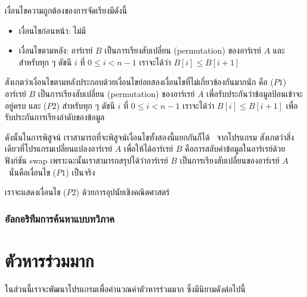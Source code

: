 เงื่อนไข{\wbr}ความ{\wbr}ถูกต้อง{\wbr}ของ{\wbr}การ{\wbr}จัดเรียง{\wbr}มี{\wbr}ดังนี้{\wbr}
\begin{itemize}
\item เงื่อนไข{\wbr}ก่อนหน้า: ไม่{\wbr}มี{\wbr}
\item เงื่อนไข{\wbr}ตาม{\wbr}หลัง: อาร์เรย์ $B$ เป็น{\wbr}การ{\wbr}เรียง{\wbr}สับเปลี่ยน (permutation) ของ{\wbr}อาร์เรย์ $A$ และ{\wbr}สำหรับ{\wbr}ทุก ๆ ดัชนี $i$ ที่ $0\leq i<n-1$ เรา{\wbr}จะ{\wbr}ได้{\wbr}ว่า $B[i]\leq B[i+1]$
\end{itemize}

สังเกต{\wbr}ว่า{\wbr}เงื่อนไข{\wbr}ตาม{\wbr}หลัง{\wbr}ประกอบ{\wbr}ด้วย{\wbr}เงื่อนไข{\wbr}ย่อย{\wbr}สอง{\wbr}เงื่อนไข{\wbr}ที่{\wbr}ไม่{\wbr}เกี่ยวข้อง{\wbr}กัน{\wbr}มาก{\wbr}นัก คือ{\wbr}
($P1$) อาร์เรย์ $B$ เป็น{\wbr}การ{\wbr}เรียง{\wbr}สับเปลี่ยน (permutation) ของ{\wbr}อาร์เรย์ $A$
เพื่อ{\wbr}รับประกัน{\wbr}ว่า{\wbr}ข้อมูล{\wbr}ป้อน{\wbr}เข้า{\wbr}จะ{\wbr}อยู่{\wbr}ครบ และ ($P2$) สำหรับ{\wbr}ทุก ๆ ดัชนี $i$ ที่ $0\leq
i<n-1$ เรา{\wbr}จะ{\wbr}ได้{\wbr}ว่า $B[i]\leq B[i+1]$ เพื่อ{\wbr}รับประกัน{\wbr}การ{\wbr}เรียงลำดับ{\wbr}ของ{\wbr}ข้อมูล{\wbr}

ดังนั้น{\wbr}ใน{\wbr}การ{\wbr}พิสูจน์ เรา{\wbr}สามารถ{\wbr}ที่{\wbr}จะ{\wbr}พิสูจน์{\wbr}เงื่อนไข{\wbr}ทั้ง{\wbr}สอง{\wbr}นี้{\wbr}แยกกัน{\wbr}ก็ได้ \ จาก{\wbr}โปรแกรม{\wbr}
สังเกต{\wbr}ว่า{\wbr}สิ่ง{\wbr}เดียว{\wbr}ที่{\wbr}โปรแกรม{\wbr}เปลี่ยนแปลง{\wbr}อาร์เรย์ $A$ เพื่อให้{\wbr}ได้{\wbr}อาร์เรย์ $B$
คือ{\wbr}การ{\wbr}สลับ{\wbr}ค่า{\wbr}ข้อมูล{\wbr}ใน{\wbr}อาร์เรย์{\wbr}ด้วย{\wbr}ฟังก์ชัน {\ct swap}
เพราะฉะนั้น{\wbr}เรา{\wbr}สามารถ{\wbr}สรุป{\wbr}ได้{\wbr}ว่า{\wbr}อาร์เรย์ $B$ เป็น{\wbr}การ{\wbr}เรียง{\wbr}สับเปลี่ยน{\wbr}ของ{\wbr}อาร์เรย์ $A$
\ นั่น{\wbr}คือ{\wbr}เงื่อนไข ($P1$) เป็นจริง{\wbr}

เรา{\wbr}จะ{\wbr}แสดง{\wbr}เงื่อนไข ($P2$) ด้วย{\wbr}การ{\wbr}อุปนัย{\wbr}เชิง{\wbr}คณิตศาสตร์{\wbr}

\subsubsection{อัล{\wbr}กอ{\wbr}ริ{\wbr}ทึม{\wbr}การ{\wbr}ค้นหา{\wbr}แบบ{\wbr}ทวิภาค}

\section{ตัวหารร่วมมาก}

ใน{\wbr}ส่วน{\wbr}นี้{\wbr}เรา{\wbr}จะ{\wbr}พัฒนา{\wbr}โปรแกรม{\wbr}เพื่อ{\wbr}คำนวณ{\wbr}ค่าตัว{\wbr}หารร่วมมาก ซึ่ง{\wbr}มี{\wbr}นิยาม{\wbr}ดังต่อไปนี้{\wbr}

